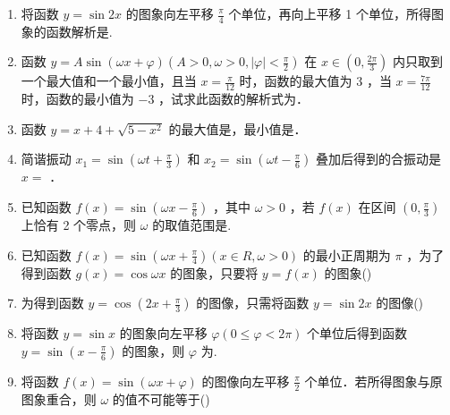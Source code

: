\begin{enumerate}
    \item 将函数 $y=\sin 2 x$ 的图象向左平移 $\frac{\pi}{4}$ 个单位，再向上平移 1 个单位，所得图象的函数解析是.

    \item 函数 $y=A \sin (\omega x+\varphi)\left(A>0, \omega>0,|\varphi|<\frac{\pi}{2}\right)$ 在 $x \in\left(0, \frac{2 \pi}{3}\right)$ 内只取到一个最大值和一个最小值，且当 $x=\frac{\pi}{12}$ 时，函数的最大值为 3 ，当 $x=\frac{7 \pi}{12}$ 时，函数的最小值为 $-3$ ，试求此函数的解析式为．

    \item 函数 $y=x+4+\sqrt{5-x^2}$ 的最大值是，最小值是．

    \item 简谐振动 $x_1=\sin \left(\omega t+\frac{\pi}{3}\right)$ 和 $x_2=\sin \left(\omega t-\frac{\pi}{6}\right)$ 叠加后得到的合振动是 $x=$ ．

    \item 已知函数 $f(x)=\sin \left(\omega x-\frac{\pi}{6}\right)$ ，其中 $\omega>0$ ，若 $f(x)$ 在区间 $\left(0, \frac{\pi}{3}\right)$ 上恰有 2 个零点，则 $\omega$ 的取值范围是\blkda{($\frac{7}{2},\frac{13}{2}$]}.

    \item 已知函数 $f(x)=\sin \left(\omega x+\frac{\pi}{4}\right)(x \in R, \omega>0)$ 的最小正周期为 $\pi$ ，为了得到函数 $g(x)=\cos \omega x$ 的图象，只要将 $y=f(x)$ 的图象\dotfill()

    \item 为得到函数 $y=\cos \left(2 x+\frac{\pi}{3}\right)$ 的图像，只需将函数 $y=\sin 2 x$ 的图像\dotfill()

    \item 将函数 $y=\sin x$ 的图象向左平移 $\varphi(0 \leq \varphi<2 \pi)$ 个单位后得到函数 $y=\sin \left(x-\frac{\pi}{6}\right)$ 的图象，则 $\varphi$ 为.

    \item 将函数 $f(x)=\sin (\omega x+\varphi)$ 的图像向左平移 $\frac{\pi}{2}$ 个单位．若所得图象与原图象重合，则 $\omega$ 的值不可能等于\dotfill()


\end{enumerate}
